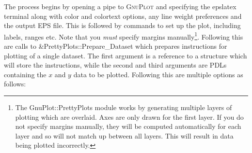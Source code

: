The process begins by opening a pipe to {\normalfont \scshape GnuPlot} and specifying the {\normalfont \ttfamily epslatex} terminal along with {\normalfont \ttfamily color} and {\normalfont \ttfamily colortext} options, any line weight preferences and the output EPS file. This is followed by commands to set up the plot, including labels, ranges etc. Note that you \emph{must} specify margins manually\footnote{The {\normalfont \ttfamily GnuPlot::PrettyPlots} module works by generating multiple layers of plotting which are overlaid. Axes are only drawn for the first layer. If you do not specify margins manually, they will be computed automatically for each layer and so will not match up between all layers. This will result in data being plotted incorrectly.}. Following this are calls to {\normalfont \ttfamily \&PrettyPlots::Prepare\_Dataset} which prepares instructions for plotting of a single dataset. The first argument is a reference to a structure which will store the instructions, while the second and third arguments are PDLs containing the $x$ and $y$ data to be plotted. Following this are multiple options as follows:
